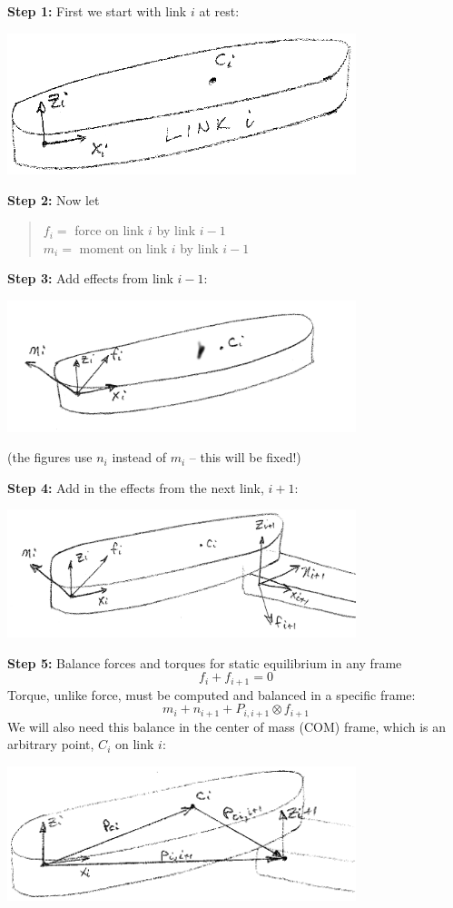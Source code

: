{\bf Step 1: } First we start with link $i$ at rest:

\includegraphics[width=4.0in]{figs06/00922.eps}

{\bf Step 2: } Now let
\begin{quotation}\noindent
$f_i = $ force on link $i$ by link $i-1$\\
$m_i = $ moment  on link $i$ by link $i-1$
\end{quotation}

{\bf Step 3: }
Add effects from link $i-1$:


\includegraphics[width=4.0in]{figs06/00923.png}

(the figures use $n_i$ instead of $m_i$ -- this will be fixed!)


{\bf Step 4: }
Add in the effects from the next link, $i+1$:


\includegraphics[width=4.0in]{figs06/00924.png}


{\bf Step 5: }
Balance forces and torques for static equilibrium in any frame
\[
f_i + f_{i+1} = 0
\]
Torque, unlike force, must be computed and balanced in a specific frame:
\[
m_i+n_{i+1}+P_{i,i+1}\otimes f_{i+1}
\]
We will also need this balance in the center of mass (COM) frame, which is an arbitrary point, $C_i$ on link $i$:


\includegraphics[width=4.0in]{figs06/00925.eps}

